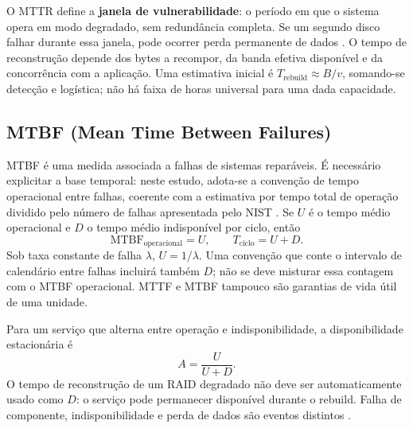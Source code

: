 \documentclass[titlepage]{article}
\begin{document}
O MTTR define a \textbf{janela de vulnerabilidade}: o período em que o sistema opera em modo degradado, sem redundância completa. Se um segundo disco falhar durante essa janela, pode ocorrer perda permanente de dados \cite{silberschatz2020}. O tempo de reconstrução depende dos bytes a recompor, da banda efetiva disponível e da concorrência com a aplicação. Uma estimativa inicial é $T_{\mathrm{rebuild}}\approx B/v$, somando-se detecção e logística; não há faixa de horas universal para uma dada capacidade.

\subsection{MTBF (Mean Time Between Failures)}
MTBF é uma medida associada a falhas de sistemas reparáveis. É necessário explicitar a base temporal: neste estudo, adota-se a convenção de tempo operacional entre falhas, coerente com a estimativa por tempo total de operação dividido pelo número de falhas apresentada pelo NIST \cite{nist_mtbf}. Se $U$ é o tempo médio operacional e $D$ o tempo médio indisponível por ciclo, então
\begin{equation}
    \mathrm{MTBF}_{\mathrm{operacional}}=U,
    \qquad T_{\mathrm{ciclo}}=U+D.
    \label{eq:mtbf}
\end{equation}
Sob taxa constante de falha $\lambda$, $U=1/\lambda$. Uma convenção que conte o intervalo de calendário entre falhas incluirá também $D$; não se deve misturar essa contagem com o MTBF operacional. MTTF e MTBF tampouco são garantias de vida útil de uma unidade.

Para um serviço que alterna entre operação e indisponibilidade, a disponibilidade estacionária é
\[
A=\frac{U}{U+D}.
\]
O tempo de reconstrução de um RAID degradado não deve ser automaticamente usado como $D$: o serviço pode permanecer disponível durante o rebuild. Falha de componente, indisponibilidade e perda de dados são eventos distintos \cite{snia_dictionary}.
\end{document}
